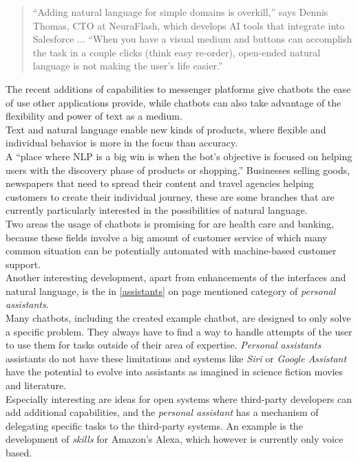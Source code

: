 \begin{quote}
“Adding natural language for simple domains is overkill,” says Dennis Thomas, CTO at NeuraFlash, which develops AI tools that integrate into Salesforce ... “When you have a visual medium and buttons can accomplish the task in a couple clicks (think easy re-order), open-ended natural language is not making the user’s life easier.”
\end{quote}

The recent additions of capabilities to messenger platforms give chatbots the ease of use other applications provide, while chatbots can also take advantage of the flexibility and power of text as a medium.
\\

Text and natural language enable new kinds of products, where flexible and individual behavior is more in the focus than accuracy.
\\
A ``place where NLP is a big win is when the bot’s objective is focused on helping users with the discovery phase of products or shopping.''\cite{neednlp}
Businesses selling goods, newspapers that need to spread their content and travel agencies helping customers to create their individual journey,
these are some branches that are currently particularly interested in the possibilities of natural language.
\\
Two areas the usage of chatbots is promising for are health care and banking\cite{botlist},
because these fields involve a big amount of customer service of which many common situation can be potentially automated with machine-based customer support.
\\

Another interesting development, apart from enhancements of the interfaces and natural language, is the in \ref{assistants} on page \pageref{assistants} mentioned category of \emph{personal assistants}.
\\
Many chatbots, including the created example chatbot, are designed to only solve a specific problem.
They always have to find a way to handle attempts of the user to use them for tasks outside of their area of expertise.
\emph{Personal assistants} assistants do not have these limitations
and systems like \emph{Siri} or \emph{Google Assistant} have the potential to evolve into assistants as imagined in science fiction movies and literature\cite{assistant}.
\\
Especially interesting are ideas for open systems where third-party developers can add additional capabilities,
and the \emph{personal assistant} has a mechanism of delegating specific tasks to the third-party systems.
An example is the development of \emph{skills} for Amazon's Alexa\cite{alexa}, which however is currently only voice based.
\\

